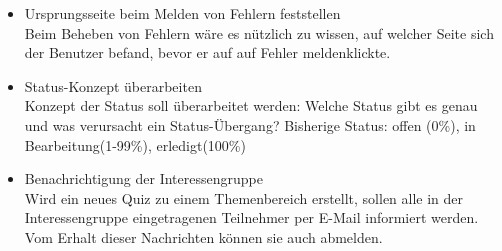 \begin{itemize}
	\item Ursprungsseite beim Melden von Fehlern feststellen \\
	Beim Beheben von Fehlern wäre es nützlich zu wissen, auf welcher Seite sich der Benutzer befand, bevor er auf auf \glqq Fehler melden\grqq klickte.
	
	\item Status-Konzept überarbeiten \\
	Konzept der Status soll überarbeitet werden: Welche Status gibt es genau und was verursacht ein Status-Übergang?
	Bisherige Status: offen (0\%), in Bearbeitung(1-99\%), erledigt(100\%)
	
	\item Benachrichtigung der Interessengruppe\\
	Wird ein neues Quiz zu einem Themenbereich erstellt, sollen alle in der Interessengruppe eingetragenen Teilnehmer per E-Mail informiert werden. Vom Erhalt dieser Nachrichten können sie auch abmelden.
	
\end{itemize}


